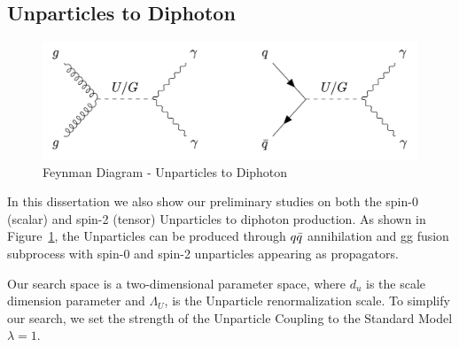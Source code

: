 

\subsection{Unparticles to Diphoton}

\begin{figure}[!htbp]
	\centering
    \includegraphics[scale=0.4]{fig/Unparticles_Graviton.png}
	\caption{Feynman Diagram - Unparticles to Diphoton}
	\label{fig:UnparticlesFeynmanDiagram}
\end{figure}

In this dissertation we also show our preliminary studies on both the spin-0 (scalar) and spin-2 (tensor) Unparticles to diphoton production. As shown in Figure~\ref{fig:UnparticlesFeynmanDiagram}, the Unparticles can be produced through $q\Bar{q}$ annihilation and gg fusion subprocess with spin-0 and spin-2 unparticles appearing as propagators. 


Our search space is a two-dimensional parameter space, where $d_u$ is the scale dimension parameter and $\Lambda_{U}$, is the Unparticle renormalization scale. To simplify our search, we set the strength of the Unparticle Coupling to the Standard Model $\lambda = 1$. 


